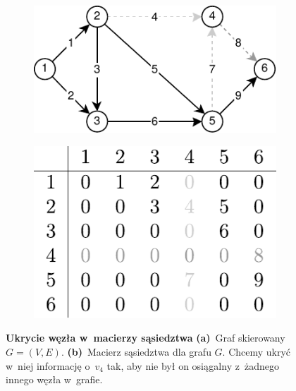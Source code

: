 \begin{figure}[!htbp]
	\centering
	\null\hfill
	\begin{subfigure}[b]{0.5\textwidth}
		\includegraphics[width=\textwidth]{Chapter_I/ADJACENCY-MATRIX-REMOVE-Example/a.pdf}
		\caption{}
		\label{fig:adjacencyMatrixHideNode:a}
	\end{subfigure}%
	\hfill
	\begin{subfigure}[b]{0.4\textwidth}
		\includegraphics[width=\textwidth]{Chapter_I/ADJACENCY-MATRIX-REMOVE-Example/b.pdf}
		\caption{}
		\label{fig:adjacencyMatrixHideNode:b}
	\end{subfigure}
	\hfill\null
	\caption{
		\textbf{Ukrycie węzła w~macierzy sąsiedztwa}
		\textbf{(a)}~Graf skierowany $G = \left( V, E \right)$.
		\textbf{(b)}~Macierz sąsiedztwa dla grafu $G$.
		Chcemy ukryć w~niej informację o~$v_{4}$ tak, aby nie był on osiągalny z~żadnego innego węzła w~grafie.
	}
	\label{fig:adjacencyMatrixHideNode}
\end{figure}


